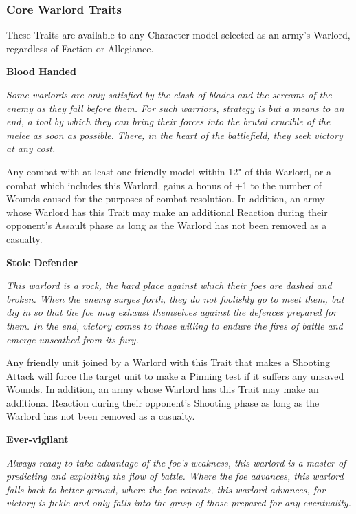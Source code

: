\subsubsection{Core Warlord Traits}
These Traits are available to any Character model selected as an army’s Warlord, regardless of Faction or Allegiance.

\begin{multicols}{2}

\textbf{Blood Handed}

\textit{Some warlords are only satisfied by the clash of blades and
the screams of the enemy as they fall before them. For such
warriors, strategy is but a means to an end, a tool by which
they can bring their forces into the brutal crucible of the melee
as soon as possible. There, in the heart of the battlefield, they
seek victory at any cost.}

\vspace*{1em}
Any combat with at least one friendly model within 12"
of this Warlord, or a combat which includes this Warlord,
gains a bonus of +1 to the number of Wounds caused for
the purposes of combat resolution. In addition, an army
whose Warlord has this Trait may make an additional
Reaction during their opponent’s Assault phase as long as
the Warlord has not been removed as a casualty.

\vspace*{1em}
\textbf{Stoic Defender}

\textit{This warlord is a rock, the hard place against which their foes
	are dashed and broken. When the enemy surges forth, they do
	not foolishly go to meet them, but dig in so that the foe may
	exhaust themselves against the defences prepared for them. In
	the end, victory comes to those willing to endure the fires of
	battle and emerge unscathed from its fury.}

\vspace*{1em}
Any friendly unit joined by a Warlord with this Trait
that makes a Shooting Attack will force the target unit to
make a Pinning test if it suffers any unsaved Wounds. In
addition, an army whose Warlord has this Trait may make
an additional Reaction during their opponent’s Shooting
phase as long as the Warlord has not been removed
as a casualty.

\vspace*{1em}
\textbf{Ever-vigilant}

\textit{Always ready to take advantage of the foe’s weakness, this
	warlord is a master of predicting and exploiting the flow of
	battle. Where the foe advances, this warlord falls back to
	better ground, where the foe retreats, this warlord advances,
	for victory is fickle and only falls into the grasp of those
	prepared for any eventuality.}


\end{multicols}
